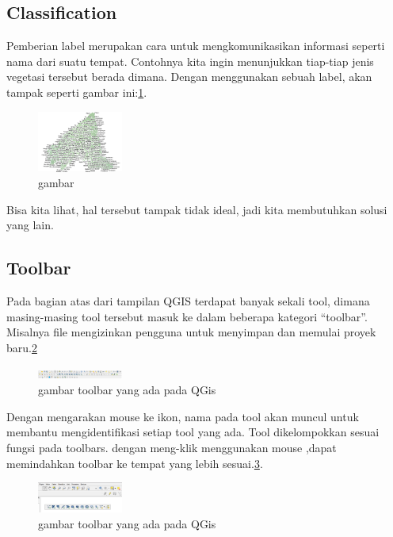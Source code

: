 \subsection{Classification}
Pemberian label merupakan cara untuk mengkomunikasikan informasi seperti nama dari suatu tempat. Contohnya kita ingin menunjukkan tiap-tiap jenis vegetasi tersebut berada dimana. Dengan menggunakan sebuah label, akan tampak seperti gambar ini:\ref{qgis:image13}.
\begin{figure}[ht]
        \centerline{\includegraphics[width=0.25\textwidth]{figures/image13}}
        \caption{gambar}
        \label{qgis:image13}
        \end{figure}
Bisa kita lihat, hal tersebut tampak tidak ideal, jadi kita membutuhkan solusi yang lain. 


\subsection{Toolbar}
Pada bagian atas dari tampilan QGIS terdapat banyak sekali tool, dimana masing-masing tool tersebut masuk ke dalam beberapa kategori “toolbar”. Misalnya file mengizinkan pengguna untuk menyimpan dan memulai proyek baru.\ref{qgis:toolbar}
\begin{figure}[ht]
    \centerline{\includegraphics[width=0.25\textwidth]{figures/toolbar}}
    \caption{gambar toolbar yang ada pada QGis}
    \label{qgis:toolbar}
    \end{figure}

Dengan mengarakan mouse ke ikon, nama pada tool akan muncul untuk membantu mengidentifikasi setiap tool yang ada. Tool dikelompokkan sesuai fungsi pada toolbars. dengan meng-klik menggunakan mouse ,dapat memindahkan toolbar ke tempat yang lebih sesuai.\ref{qgis:toolbar1}.
\begin{figure}[ht]
    \centerline{\includegraphics[width=0.25\textwidth]{figures/toolbar1}}
    \caption{gambar toolbar yang ada pada QGis}
    \label{qgis:toolbar1}
    \end{figure}
    
